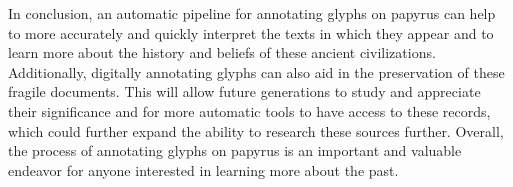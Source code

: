 
In conclusion, an automatic pipeline for annotating glyphs on papyrus can help to more accurately and quickly interpret the texts in which they appear and to learn more about the history and beliefs of these ancient civilizations. Additionally, digitally annotating glyphs can also aid in the preservation of these fragile documents. This will allow future generations to study and appreciate their significance and for more automatic tools to have access to these records, which could further expand the ability to research these sources further. Overall, the process of annotating glyphs on papyrus is an important and valuable endeavor for anyone interested in learning more about the past.

